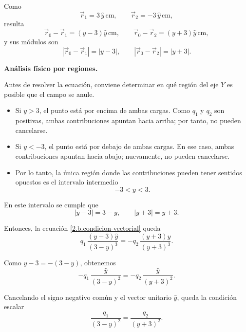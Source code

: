 \documentclass[11pt]{article}
\begin{document}
Como
\begin{equation*}
\vec r_1=3\,\hat y\,\mathrm{cm},
\qquad
\vec r_2=-3\,\hat y\,\mathrm{cm},
\end{equation*}
resulta
\begin{equation*}
\vec r_0-\vec r_1=(y-3)\hat y\,\mathrm{cm},
\qquad
\vec r_0-\vec r_2=(y+3)\hat y\,\mathrm{cm},
\end{equation*}
y sus módulos son
\begin{equation*}
|\vec r_0-\vec r_1|=|y-3|,
\qquad
|\vec r_0-\vec r_2|=|y+3|.
\end{equation*}

\textbf{Análisis físico por regiones.}

Antes de resolver la ecuación, conviene determinar en qué región del eje $Y$ es posible que el campo se anule.

\begin{itemize}
    \item Si $y>3$, el punto está por encima de ambas cargas. Como $q_1$ y $q_2$ son positivas, ambas contribuciones apuntan hacia arriba; por tanto, no pueden cancelarse.

    \item Si $y<-3$, el punto está por debajo de ambas cargas. En ese caso, ambas contribuciones apuntan hacia abajo; nuevamente, no pueden cancelarse.

    \item Por lo tanto, la única región donde las contribuciones pueden tener sentidos opuestos es el intervalo intermedio
    \begin{equation*}
    -3<y<3.
    \end{equation*}
\end{itemize}

En este intervalo se cumple que
\begin{equation*}
|y-3|=3-y,
\qquad
|y+3|=y+3.
\end{equation*}

Entonces, la ecuación \eqref{2.b.condicion-vectorial} queda
\begin{equation*}
q_1\,\frac{(y-3)\hat y}{(3-y)^3}
=
-q_2\,\frac{(y+3)\hat y}{(y+3)^3}.
\end{equation*}

Como $y-3=-(3-y)$, obtenemos
\begin{equation*}
-q_1\,\frac{\hat y}{(3-y)^2}
=
-q_2\,\frac{\hat y}{(y+3)^2}.
\end{equation*}

Cancelando el signo negativo común y el vector unitario $\hat y$, queda la condición escalar
\begin{equation*}
\frac{q_1}{(3-y)^2}
=
\frac{q_2}{(y+3)^2}.
\end{equation*}
\end{document}
